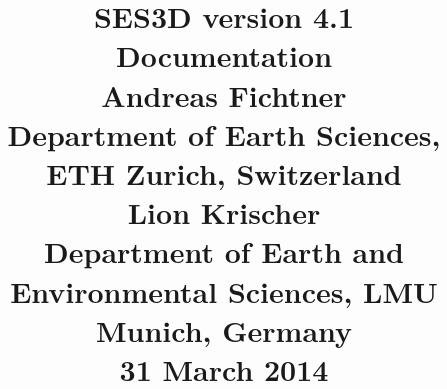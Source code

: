 \documentclass[graybox,envcountchap,sectrefs]{svmono}
\begin{document}
\title{ 	\Huge{\textbf{SES3D} version 4.1}\\[10pt] 
	\large{Documentation}\\[100pt]
	\LARGE{Andreas Fichtner}\\[5pt] 
	\normalsize{Department of Earth Sciences, ETH Zurich, Switzerland}\\[15pt]
	\LARGE{Lion Krischer}\\[5pt]
	\normalsize{Department of Earth and Environmental Sciences, LMU Munich, Germany}\\[90pt]
	\normalsize{31 March 2014} }

\maketitle

\frontmatter%

\tableofcontents



\mainmatter%


      
	
	                  
	
	                            


          

	        
	
	



\end{document}
